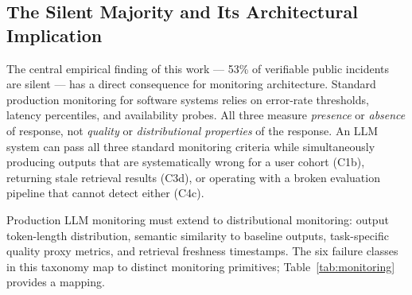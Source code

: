 \documentclass{article}
\begin{document}
\subsection{The Silent Majority and Its Architectural Implication}

The central empirical finding of this work --- 53\% of verifiable public incidents are silent ---
has a direct consequence for monitoring architecture.  Standard production
monitoring for software systems relies on error-rate thresholds, latency
percentiles, and availability probes.  All three measure \emph{presence} or
\emph{absence} of response, not \emph{quality} or \emph{distributional
properties} of the response.  An LLM system can pass all three standard
monitoring criteria while simultaneously producing outputs that are
systematically wrong for a user cohort (C1b), returning stale retrieval results
(C3d), or operating with a broken evaluation pipeline that cannot detect either
(C4c).

Production LLM monitoring must extend to distributional monitoring: output
token-length distribution, semantic similarity to baseline outputs,
task-specific quality proxy metrics, and retrieval freshness timestamps.
The six failure classes in this taxonomy map to distinct monitoring primitives;
Table~\ref{tab:monitoring} provides a mapping.

\begin{table}[t]
\caption{Recommended monitoring primitives per failure class.}
\label{tab:monitoring}
\centering
\small
{}
\end{table}
\end{document}
